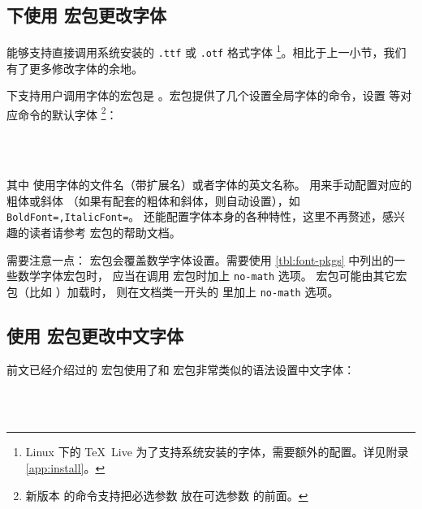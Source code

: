 \subsection{ 下使用  宏包更改字体}\label{subsec:fontspec}

 能够支持直接调用系统安装的 \texttt{.ttf} 或 \texttt{.otf} 格式字体%
\footnote{Linux 下的 \TeX\ Live 为了支持系统安装的字体，需要额外的配置。详见附录 \ref{app:install}。}。相比于上一小节，我们有了更多修改字体的余地。

 下支持用户调用字体的宏包是 。宏包提供了几个设置全局字体的命令，设置  等对应命令的默认字体%
\footnote{新版本  的命令支持把必选参数  放在可选参数  的前面。}：
\begin{command}
 \\
 \\
\end{command}
其中  使用字体的文件名（带扩展名）或者字体的英文名称。 用来手动配置对应的粗体或斜体
（如果有配套的粗体和斜体，则自动设置），如 \texttt{Bold\-Font=,Italic\-Font=}。
 还能配置字体本身的各种特性，这里不再赘述，感兴趣的读者请参考  宏包的帮助文档。

需要注意一点： 宏包会覆盖数学字体设置。需要使用 \ref{tbl:font-pkgs} 中列出的一些数学字体宏包时，
应当在调用  宏包时加上 \texttt{no-math} 选项。 宏包可能由其它宏包（比如 ）加载时，
则在文档类一开头的  里加上 \texttt{no-math} 选项。

\subsection{使用  宏包更改中文字体}\label{subsec:CJKfont}

前文已经介绍过的  宏包使用了和  宏包非常类似的语法设置中文字体：
\begin{command}
 \\
 \\
\end{command}

